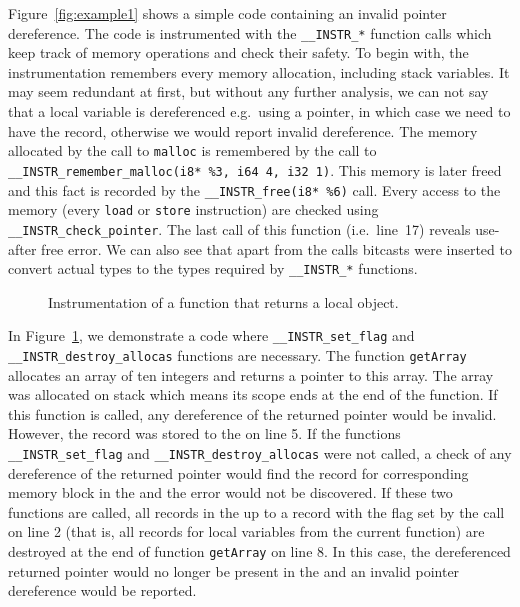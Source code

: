 Figure~\ref{fig:example1} shows a simple code containing an invalid
pointer dereference. The code is instrumented with the
\texttt{\_\_INSTR\_*} function calls which keep track of memory
operations and check their safety. To begin with, the instrumentation
remembers every memory allocation, including stack variables. It may
seem redundant at first, but without any further analysis, we can not
say that a local variable is dereferenced e.g.~using a pointer, in
which case we need to have the record, otherwise we would report
invalid dereference.
The memory allocated by the call to \texttt{malloc} is remembered by the call
to \texttt{\_\_INSTR\_remember\_malloc(i8* \%3, i64 4, i32 1)}. This memory is
later freed and this fact is recorded by the \texttt{\_\_INSTR\_free(i8* \%6)}
call. Every access to the memory (every \texttt{load} or \texttt{store}
instruction) are checked using \texttt{\_\_INSTR\_check\_pointer}. The last
call of this function (i.e.~line~17) reveals use-after free error. We can also
see that apart from the  calls bitcasts were inserted to convert actual types
to the types required by \texttt{\_\_INSTR\_*} functions.

\begin{figure}[t]

\caption{Instrumentation of a function that returns a local object.}
\label{fig:examplesetflags}
\end{figure}

In Figure~\ref{fig:examplesetflags}, we demonstrate a code where
\texttt{\_\_INSTR\_set\_flag} and \texttt{\_\_INSTR\_destroy\_allocas}
functions are necessary. The function \texttt{getArray} allocates an array of
ten integers and returns a pointer to this array. The array was allocated on
stack which means its scope ends at the end of the function. If this function
is called, any dereference of the returned pointer would be invalid. However,
the record was stored to the \stacklist on line 5. If the functions
\texttt{\_\_INSTR\_set\_flag} and \texttt{\_\_INSTR\_destroy\_allocas} were not
called, a check of any dereference of the returned pointer would find the
record for corresponding memory block in the \stacklist and the error would not
be discovered. If these two functions are called, all records in the \stacklist
up to a record with the flag set by the call on line 2 (that is, all records
for local variables from the current function) are destroyed at the end of
function \texttt{getArray} on line 8. In this case, the dereferenced
returned pointer would no longer be present in the \stacklist and an
invalid pointer dereference would be reported.

